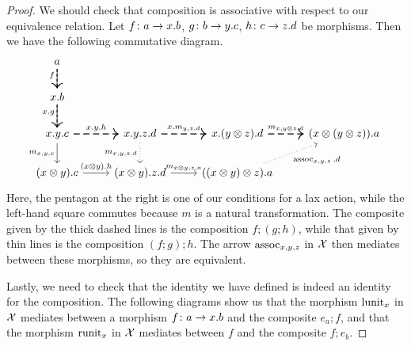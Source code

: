 \documentclass{article}
\begin{document}
\begin{proof}
  We should check that \Mellies composition is associative with respect to our equivalence relation.  
  Let $f \colon a \to x.b$, $g\colon b \to y.c$, $h \colon c \to z.d$ be \Mellies morphisms.  
  Then we have the following commutative diagram.
  \[
    \begin{tikzcd}
      a \arrow[d, "f"' yshift=3pt] \arrow[d, dashed, thick]
        &
          &
            & \\
      x.b \arrow[d, "x.g"' yshift=3pt] \arrow[d, dashed, thick]
        &
          &
            & \\
      x.y.c \arrow[r, "x.y.h", thick, dashed] \arrow[d, "{m_{x,y,c}}"']
        & x.y.z.d \arrow[r, "x.m_{y,z,d}", thick, dashed] \arrow[d, "m_{x,y,z.d}"', dotted]
          & x.(y\tensor z).d \arrow[r, "m_{x,y\tensor z,d}", thick, dashed]
            & (x \tensor (y \tensor z)) . a \\
      (x \tensor y).c \arrow[r, "(x\tensor y).h"]
        & (x\tensor y).z.d \arrow[r, "m_{x\tensor y,z,a}"]
          & ((x\tensor y)\tensor z) . a \arrow[ur, "\assoc_{x,y,z}.d"', dotted]
            &
    \end{tikzcd}
    \]
  Here, the pentagon at the right is one of our conditions for a lax action, while the left-hand square commutes because $m$ is a natural transformation.  
  The composite given by the thick dashed lines is the \Mellies composition $f;(g;h)$, while that given by thin lines is the \Mellies composition $(f;g);h$.  
  The arrow $\operatorname{assoc}_{x,y,z}$ in $\mathcal X$ then mediates between these morphisms, so they are equivalent.

  Lastly, we need to check that the identity we have defined is indeed an identity for the composition.  
  The following diagrams show us that the morphism $\operatorname{lunit}_x$ in $\mathcal X$ mediates between a \Mellies morphism $f\colon a \to x.b$ and the \Mellies composite $e_a;f$, and that the morphism $\operatorname{runit}_x$ in $\mathcal X$ mediates between $f$ and the \Mellies composite $f;e_b$.
\end{proof}
\end{document}
